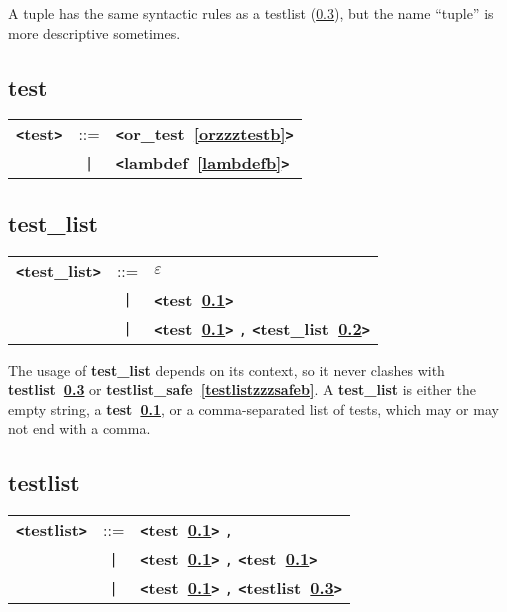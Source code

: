 \documentclass[12pt]{article}
\begin{document}
A tuple has the same syntactic rules as a testlist (\ref{testlistb}), but the name ``tuple'' is more descriptive sometimes.

\subsection{test}
\label{testb}

\begin{tabular}{lcl}
{\bf \verb+<+test\verb+>+} & ::=  & {\bf \verb+<+or\_test~\ref{orzzztestb}\verb+>+}  \\
 & \verb+|+  & {\bf \verb+<+lambdef~\ref{lambdefb}\verb+>+}  \\
\end{tabular}

\subsection{test\_list}
\label{testzzzlistb}
\begin{tabular}{lcl}
{\bf \verb+<+test\_list\verb+>+} & ::=  & $\varepsilon$ \\
 & \verb+|+  & {\bf \verb+<+test~\ref{testb}\verb+>+}  \\
 & \verb+|+  & {\bf \verb+<+test~\ref{testb}\verb+>+}  \verb|,| {\bf \verb+<+test\_list~\ref{testzzzlistb}\verb+>+}  \\
\end{tabular}

The usage of {\bf test\_{}list} depends on its context, so it never clashes with {\bf testlist~\ref{testlistb}} or {\bf testlist\_{}safe~\ref{testlistzzzsafeb}}.  A {\bf test\_{}list} is either the empty string, a {\bf test~\ref{testb}}, or a comma-separated list of tests, which may or may not end with a comma.

\subsection{testlist}
\label{testlistb}
\begin{tabular}{lcl}
{\bf \verb+<+testlist\verb+>+} & ::=  & {\bf \verb+<+test~\ref{testb}\verb+>+}  \verb|,| \\
 & \verb+|+  & {\bf \verb+<+test~\ref{testb}\verb+>+}  \verb|,| {\bf \verb+<+test~\ref{testb}\verb+>+}  \\
 & \verb+|+  & {\bf \verb+<+test~\ref{testb}\verb+>+}  \verb|,| {\bf \verb+<+testlist~\ref{testlistb}\verb+>+}  \\
\end{tabular}
\end{document}
